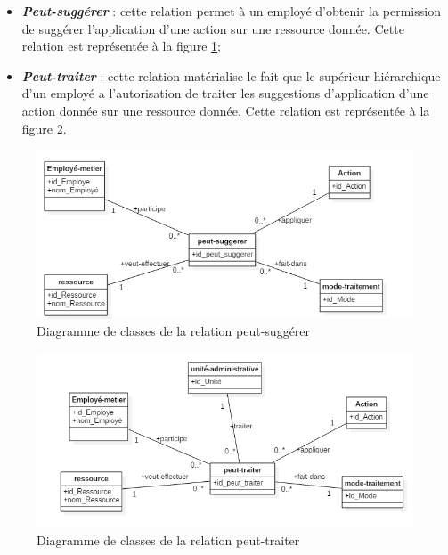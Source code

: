 \begin{itemize}

\item \textbf{\textit{Peut-suggérer}} : cette relation permet à un employé d'obtenir la permission de suggérer l'application d'une action sur une ressource donnée. Cette relation est représentée à la figure \ref{figpeut-suggerer};
\item \textbf{\textit{Peut-traiter}} : cette relation matérialise le fait que le supérieur hiérarchique d'un employé a l'autorisation de traiter les suggestions d'application d'une action donnée sur une ressource donnée. Cette relation est représentée à la figure \ref{figpeut-traiter}.

\end{itemize}

\begin{figure}[h!]
    \centering
		\includegraphics[scale=0.7]{chap3/images/peut-suggerer.png}
    \caption{Diagramme de classes de la relation peut-suggérer}
	 \label{figpeut-suggerer}
\end{figure} 

\begin{figure}[h!]
    \centering
		\includegraphics[scale=0.7]{chap3/images/peut-traiter.png}
    \caption{Diagramme de classes de la relation peut-traiter}
	 \label{figpeut-traiter}
\end{figure} 


